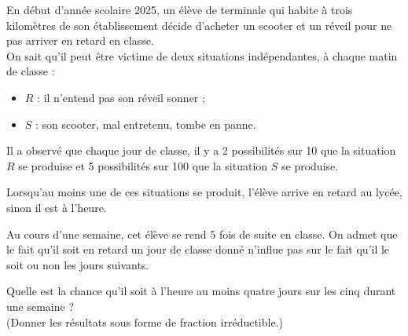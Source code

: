 \begin{exercice}
En début d’année scolaire 2025, un élève de terminale qui habite à trois kilomètres de son établissement décide d’acheter un scooter et un réveil pour ne pas arriver en retard en classe.\\
On sait qu’il peut être victime de deux situations indépendantes, à chaque matin de classe :

\begin{itemize}
  \item $R$ : il n’entend pas son réveil sonner ;
  \item $S$ : son scooter, mal entretenu, tombe en panne.
\end{itemize}

\begin{description}
  \item Il a observé que chaque jour de classe, il y a 2 possibilités sur 10 que la situation $R$ se produise et 5 possibilités sur 100 que la situation $S$ se produise.

Lorsqu’au moins une de ces situations se produit, l’élève arrive en retard au lycée, sinon il est à l’heure.

\item Au cours d'une  semaine, cet élève se rend 5 fois de suite en classe. On admet que le fait qu’il soit en retard un jour de classe donné n’influe pas sur le fait qu’il le soit ou non les jours suivants.
\item 
Quelle est la chance qu’il soit à l’heure au moins quatre jours sur les cinq durant une semaine ?\\
(Donner les résultats sous forme de fraction irréductible.)
\end{description}
\end{exercice}


